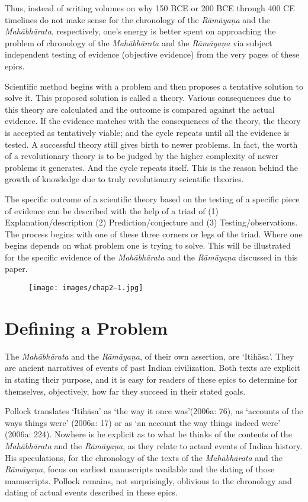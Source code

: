 Thus, instead of writing volumes on why 150 BCE or 200 BCE through 400 CE timelines do not make sense for the chronology of the \textit{Rāmāyaṇa} and the \textit{Mahābhārata}, respectively, one’s energy is better spent on approaching the problem of chronology of the \textit{Mahābhārata} and the \textit{Rāmāyaṇa} via subject independent testing of evidence (objective evidence) from the very pages of these epics.

Scientific method begins with a problem and then proposes a tentative solution to solve it. This proposed solution is called a theory. Various consequences due to this theory are calculated and the outcome is compared against the actual evidence. If the evidence matches with the consequences of the theory, the theory is accepted as tentatively viable; and the cycle repeats until all the evidence is tested. A successful theory still gives birth to newer problems. In fact, the worth of a revolutionary theory is to be judged by the higher complexity of newer problems it generates. And the cycle repeats itself. This is the reason behind the growth of knowledge due to truly revolutionary scientific theories.

The specific outcome of a scientific theory based on the testing of a specific piece of evidence can be described with the help of a triad of (1) Explanation/description (2) Prediction/conjecture and (3) Testing/observations. The process begins with one of these three corners or legs of the triad. Where one begins depends on what problem one is trying to solve. This will be illustrated for the specific evidence of the \textit{Mahābhārata} and the \textit{Rāmāyaṇa} discussed in this paper.

\begin{figure}
\texttt{[image: images/chap2–1.jpg]}
\end{figure}


\section*{Defining a Problem}

The \textit{Mahābhārata} and the \textit{Rāmāyaṇa}, of their own assertion, are ‘Itihāsa’. They are ancient narratives of events of past Indian civilization. Both texts are explicit in stating their purpose, and it is easy for readers of these epics to determine for themselves, objectively, how far they succeed in their stated goals.

Pollock translates ‘Itihāsa’ as ‘the way it once was’(2006a: 76), as ‘accounts of the ways things were’ (2006a: 17) or as ‘an account the way things indeed were’ (2006a: 224). Nowhere is he explicit as to what he thinks of the contents of the \textit{Mahābhārata} and the \textit{Rāmāyaṇa}, as they relate to actual events of Indian history. His speculations, for the chronology of the texts of the \textit{Mahābhārata} and the \textit{Rāmāyaṇa}, focus on earliest manuscripts available and the dating of those manuscripts. Pollock remains, not surprisingly, oblivious to the chronology and dating of actual events described in these epics.

